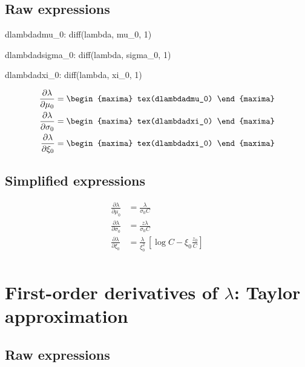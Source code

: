 \subsection*{Raw expressions}

\begin{maxima}
  dlambdadmu_0: diff(lambda, mu_0, 1)
\end{maxima}
\begin{maxima}
  dlambdadsigma_0: diff(lambda, sigma_0, 1)
\end{maxima}
\begin{maxima}
  dlambdadxi_0: diff(lambda, xi_0, 1)
\end{maxima}

{\color{MonVertF}
\begin{align*}
  \frac{\partial{\lambda}}{\partial \mu_0}
  &=
\begin{maxima}
  tex(dlambdadmu_0)
\end{maxima}\\
 \frac{\partial{\lambda}}{\partial \sigma_0}
  &=
\begin{maxima}
  tex(dlambdadxi_0)
\end{maxima}\\
\frac{\partial{\lambda}}{\partial \xi_0}
  &=
\begin{maxima}
  tex(dlambdadxi_0)
\end{maxima}
\end{align*}
}

\subsection*{Simplified expressions}

{\color{red}
\begin{align*}
  \frac{\partial{\lambda}}{\partial \mu_0}
  &= \frac{\lambda}{\sigma_0 C} \\
 \frac{\partial{\lambda}}{\partial \sigma_0}
  &=
 \frac{z \lambda}{\sigma_0 C}\\
\frac{\partial{\lambda}}{\partial \xi_0}
  &=  \frac{\lambda}{\xi_0^2} \, \left[ \log C - \xi_0 \frac{z_0}{C} \right]\\
\end{align*}
}

\section{First-order derivatives of $\lambda$: Taylor approximation}


\subsection*{Raw expressions}

